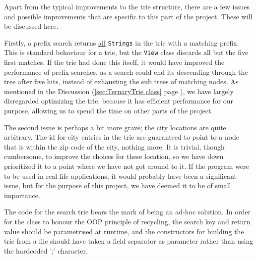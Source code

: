 Apart from the typical improvements to the trie structure, there are a few issues and possible improvements that are specific to this part of the project. These will be discussed here.

Firstly, a prefix search returns \underline{all} \texttt{Strings} in the trie with a matching prefix.
This is standard behaviour for a trie, but the \texttt{View} class discards all but the five first matches. If the trie had done this itself, it would have improved the performance of prefix searches, as a search could end its descending through the tree after five hits, instead of exhausting the sub trees of matching nodes. As mentioned in the Discussion (\ref{sec:TernaryTrie class} page \pageref{sec:TernaryTrie class}),
we have largely disregarded optimizing the trie, because it has efficient performance for our purpose, allowing us to spend the time on other parts of the project.

The second issue is perhaps a bit more grave; the city locations are quite arbitrary.
The id for city entries in the trie are guaranteed to point to a node that is within the zip code of the city, nothing more. It is trivial, though cumbersome, to improve the choices for these location, so we have down prioritized it to a point where we have not got around to it.
If the program were to be used in real life applications, it would probably have been a significant issue, but for the purpose of this project, we have deemed it to be of small importance.

The code for the search trie bears the mark of being an ad-hoc solution. In order for the class to honour the OOP principle of recycling, the search key and return value should be parametrised at runtime, and the constructors for building the trie from a file should have taken a field separator as parameter rather than using the hardcoded ';' character.
